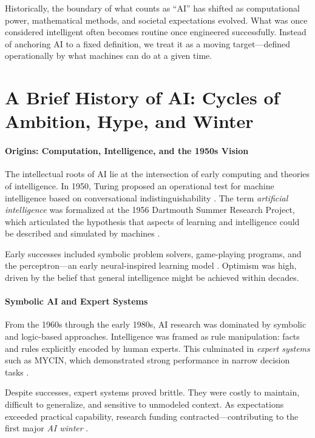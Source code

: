 \documentclass[12pt]{article}
\begin{document}
Historically, the boundary of what counts as ``AI'' has shifted as computational power, mathematical methods, and societal expectations evolved. What was once considered intelligent often becomes routine once engineered successfully. Instead of anchoring AI to a fixed definition, we treat it as a moving target—defined operationally by what machines can do at a given time.



\section*{A Brief History of AI: Cycles of Ambition, Hype, and Winter}



\paragraph{Origins: Computation, Intelligence, and the 1950s Vision}
The intellectual roots of AI lie at the intersection of early computing and theories of intelligence. In 1950, Turing proposed an operational test for machine intelligence based on conversational indistinguishability \cite{turing_1950}. The term \emph{artificial intelligence} was formalized at the 1956 Dartmouth Summer Research Project, which articulated the hypothesis that aspects of learning and intelligence could be described and simulated by machines \cite{mccarthy_etal_1955_dartmouth}.

Early successes included symbolic problem solvers, game-playing programs, and the perceptron—an early neural-inspired learning model \cite{newell_simon_1956,rosenblatt_1958}. Optimism was high, driven by the belief that general intelligence might be achieved within decades.

\paragraph{Symbolic AI and Expert Systems}
From the 1960s through the early 1980s, AI research was dominated by symbolic and logic-based approaches. Intelligence was framed as rule manipulation: facts and rules explicitly encoded by human experts. This culminated in \emph{expert systems} such as MYCIN, which demonstrated strong performance in narrow decision tasks \cite{shortliffe_1976,feigenbaum_1982}.

Despite successes, expert systems proved brittle. They were costly to maintain, difficult to generalize, and sensitive to unmodeled context. As expectations exceeded practical capability, research funding contracted—contributing to the first major \emph{AI winter} \cite{russell_norvig_2021}.
\end{document}
